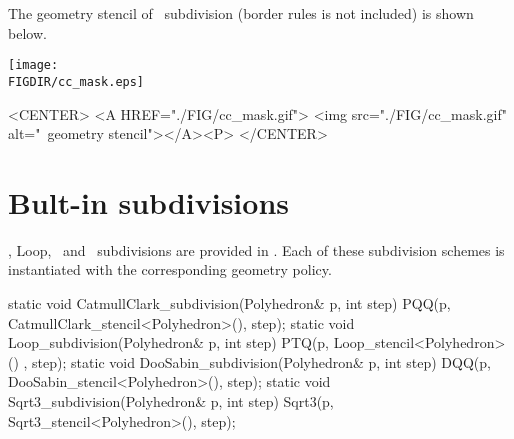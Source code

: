 
The geometry stencil of \CC\ subdivision (border rules is not included) 
is shown below. 

\begin{ccTexOnly}
  \begin{center}
    \parbox{0.4\textwidth}{%
      \texttt{[image: \\FIGDIR/cc\_mask.eps]}%
    }
  \end{center}
\end{ccTexOnly}

\begin{ccHtmlOnly}
  <CENTER>
  <A HREF="./FIG/cc_mask.gif">
     <img src="./FIG/cc_mask.gif" alt="\CC\ geometry stencil"></A><P>
  </CENTER>
\end{ccHtmlOnly}


\section{Bult-in subdivisions}
\CC , Loop, \DS\ and \ subdivisions are provided in . Each of these 
subdivision schemes is instantiated with the corresponding geometry policy.
\begin{ccExampleCode}
  static void CatmullClark_subdivision(Polyhedron& p, int step) {
    PQQ(p, CatmullClark_stencil<Polyhedron>(), step);
  }
  static void Loop_subdivision(Polyhedron& p, int step) {
    PTQ(p, Loop_stencil<Polyhedron>() , step);
  }
  static void DooSabin_subdivision(Polyhedron& p, int step) {
    DQQ(p, DooSabin_stencil<Polyhedron>(), step);
  }
  static void Sqrt3_subdivision(Polyhedron& p, int step) {
    Sqrt3(p, Sqrt3_stencil<Polyhedron>(), step);
  }
\end{ccExampleCode}

